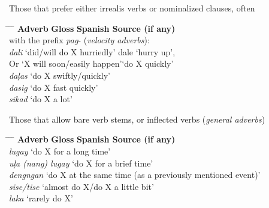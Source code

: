 \ex  Those that prefer either irrealis verbs or nominalized clauses, often \\
\begin{tabbing}
\hspace{2cm} \= \hspace{5cm} \= \hspace{1.65cm} \= \kill
\textbf{Adverb} \>   \textbf{Gloss}   \>       \textbf{Spanish Source (if any)} \\
with the prefix \textit{pag}{}- (\textit{velocity adverbs}): \\
\textit{dali} \> ‘did/will do X hurriedly' \> dale  \>  ‘hurry up’, \\ 
\>    Or ‘X will soon/easily happen’\>\>`do X quickly' \\
\textit{daļas} \> ‘do X swiftly/quickly’ \\
\textit{dasig} \>‘do X fast quickly’ \\
\textit{sikad} \>   ‘do X a lot’ \\
\end{tabbing}
\ex  Those that allow bare verb stems, or inflected verbs (\textit{general adverbs}) \\
\begin{tabbing}
\hspace{2cm} \= \hspace{5cm} \= \hspace{1.65cm} \= \kill
\textbf{Adverb} \>   \textbf{Gloss}   \>       \textbf{Spanish Source (if any)} \\
\textit{lugay}  \>     ‘do X for a long time’ \\
\textit{uļa (nang) lugay} \> \hspace{1cm} ‘do X for a brief time' \\
\textit{dengngan}  \>  ‘do X at the same time (as a previously mentioned event)’ \\
\textit{sise/tise}   \> ‘almost do X/do X a little bit’ \\
\textit{laka}   \>   ‘rarely do X’
\end{tabbing}
\z
\z

